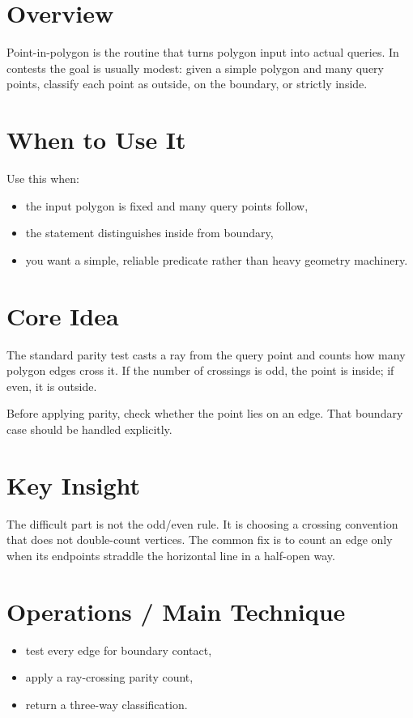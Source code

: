 \section*{Overview}

Point-in-polygon is the routine that turns polygon input into actual queries. In contests the goal is usually modest:
given a simple polygon and many query points, classify each point as outside, on the boundary, or strictly inside.

\section*{When to Use It}

Use this when:

\begin{itemize}
  \item the input polygon is fixed and many query points follow,
  \item the statement distinguishes inside from boundary,
  \item you want a simple, reliable predicate rather than heavy geometry machinery.
\end{itemize}

\section*{Core Idea}

The standard parity test casts a ray from the query point and counts how many polygon edges cross it. If the number of
crossings is odd, the point is inside; if even, it is outside.

Before applying parity, check whether the point lies on an edge. That boundary case should be handled explicitly.

\section*{Key Insight}

The difficult part is not the odd/even rule. It is choosing a crossing convention that does not double-count vertices.
The common fix is to count an edge only when its endpoints straddle the horizontal line in a half-open way.

\section*{Operations / Main Technique}

\begin{itemize}
  \item test every edge for boundary contact,
  \item apply a ray-crossing parity count,
  \item return a three-way classification.
\end{itemize}

